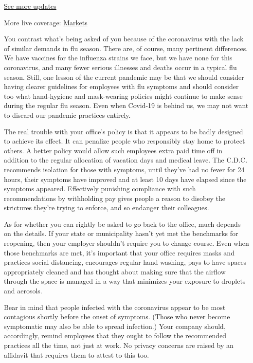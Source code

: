 \href{https://www.nytimes.com/2020/08/04/world/coronavirus-cases.html?action=click\&pgtype=Article\&state=default\&region=MAIN_CONTENT_1\&context=storylines_live_updates}{See
more updates}

More live coverage:
\href{https://www.nytimes.com/live/2020/08/04/business/stock-market-today-coronavirus?action=click\&pgtype=Article\&state=default\&region=MAIN_CONTENT_1\&context=storylines_live_updates}{Markets}

You contrast what's being asked of you because of the coronavirus with
the lack of similar demands in flu season. There are, of course, many
pertinent differences. We have vaccines for the influenza strains we
face, but we have none for this coronavirus, and many fewer serious
illnesses and deaths occur in a typical flu season. Still, one lesson of
the current pandemic may be that we should consider having clearer
guidelines for employees with flu symptoms and should consider too what
hand-hygiene and mask-wearing policies might continue to make sense
during the regular flu season. Even when Covid-19 is behind us, we may
not want to discard our pandemic practices entirely.

The real trouble with your office's policy is that it appears to be
badly designed to achieve its effect. It can penalize people who
responsibly stay home to protect others. A better policy would allow
such employees extra paid time off in addition to the regular allocation
of vacation days and medical leave. The C.D.C. recommends isolation for
those with symptoms, until they've had no fever for 24 hours, their
symptoms have improved and at least 10 days have elapsed since the
symptoms appeared. Effectively punishing compliance with such
recommendations by withholding pay gives people a reason to disobey the
strictures they're trying to enforce, and so endanger their colleagues.

As for whether you can rightly be asked to go back to the office, much
depends on the details. If your state or municipality hasn't yet met the
benchmarks for reopening, then your employer shouldn't require you to
change course. Even when those benchmarks are met, it's important that
your office requires masks and practices social distancing, encourages
regular hand washing, pays to have spaces appropriately cleaned and has
thought about making sure that the airflow through the space is managed
in a way that minimizes your exposure to droplets and aerosols.

Bear in mind that people infected with the coronavirus appear to be most
contagious shortly before the onset of symptoms. (Those who never become
symptomatic may also be able to spread infection.) Your company should,
accordingly, remind employees that they ought to follow the recommended
practices all the time, not just at work. No privacy concerns are raised
by an affidavit that requires them to attest to this too.

